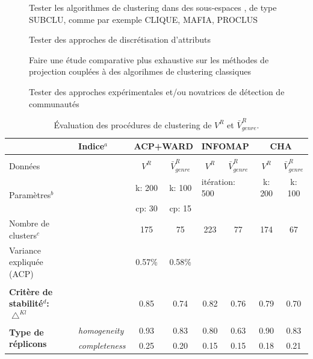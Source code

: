 \begin{description} 
\item[\textbullet] Tester les algorithmes de clustering dans des sous-espaces \citep{gan2007data}, de type SUBCLU, comme par exemple CLIQUE, MAFIA, PROCLUS \citep{gan2007data,han2012data}
\item[\textbullet] Tester des approches de discrétisation d'attributs \citep{witten2013data}
\item[\textbullet] Faire une étude comparative plus exhaustive sur les méthodes de projection couplées à des algorihmes de clustering classiques
\item[\textbullet] Tester des approches expérimentales et/ou novatrices de détection de communautés 
\end{description}

\begin{table}
\caption[Évaluation des procédures de clustering de $V^{R}$ et $\bar{V}_{genre}^{R}$]{Évaluation des procédures de clustering de $V^{R}$ et $\bar{V}_{genre}^{R}$.}\label{tabresvmstab}
\hspace{-2cm}
	  \begin{tabular}{l|l|cc|cc|cc}
        & \textbf{Indice$^{a}$} & \multicolumn{2}{l|}{\textbf{ACP+WARD}} & \multicolumn{2}{l|}{\textbf{INFOMAP}} & \multicolumn{2}{|c}{\textbf{CHA}} \\
      \hline
      &&&&&&\\[-0.2cm]
      Données & & $V^{R}$  & $\bar{V}^{R}_{genre}$  & $V^{R}$  & $\bar{V}^{R}_{genre}$ & $V^{R}$  & $\bar{V}^{R}_{genre}$  \\
      \multirow{2}{*}{Paramètres$^{b}$} & & k: 200  &  k: 100 & \multicolumn{2}{l|}{itération: 500}& k: 200  &  k: 100  \\
      & & cp: 30 & cp: 15 & & \\
      Nombre de clusters$^{c}$ &  &175 & 75 & 223 & 77 & 174 & 67\\
      Variance expliquée (ACP) & & 0.57\% & 0.58\% & & \\
      \hline
      &&&&&&\\[-0.2cm]
     \textbf{Critère de stabilité$^{d}$:} $\bigtriangleup^{Kl}$ & & 0.85 & 0.74 & 0.82 & 0.76 & 0.79 & 0.70 \\
      \hline
      \multirow{3}{*}{\textbf{Type de réplicons}} & \textit{homogeneity} &0.93 & 0.83 & 0.80 & 0.63 & 0.90 & 0.83 \\
       & \textit{completeness} & 0.25 & 0.20 & 0.15 & 0.15 & 0.18 & 0.21\\

\end{tabular}
\end{table}

